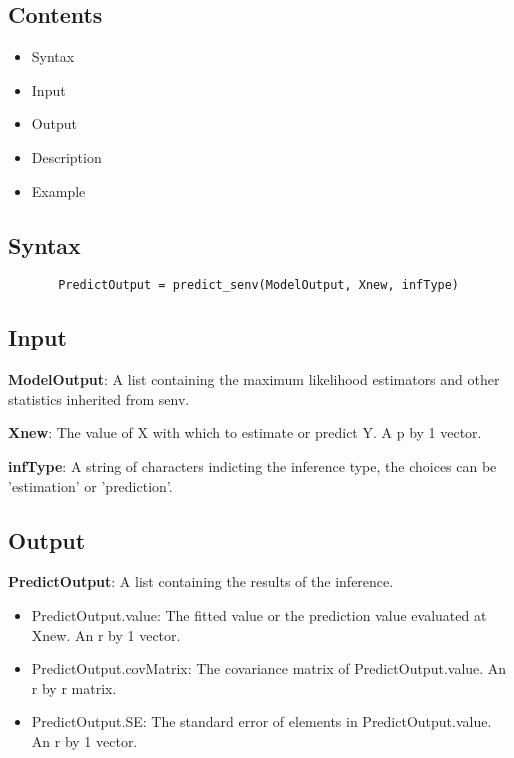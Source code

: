 \documentclass[a4paper,11pt,openany]{memoir}
\begin{document}
\subsection*{Contents}

\begin{itemize}
\setlength{\itemsep}{-1ex}
   \item Syntax
   \item Input
   \item Output
   \item Description
   \item Example
\end{itemize}


\subsection*{Syntax}


\begin{verbatim}       PredictOutput = predict_senv(ModelOutput, Xnew, infType)\end{verbatim}
    

\subsection*{Input}

\begin{par}
\textbf{ModelOutput}: A list containing the maximum likelihood estimators and other statistics inherited from senv.
\end{par} \vspace{1em}
\begin{par}
\textbf{Xnew}: The value of X with which to estimate or predict Y.  A p by 1 vector.
\end{par} \vspace{1em}
\begin{par}
\textbf{infType}: A string of characters indicting the inference type, the choices can be 'estimation' or 'prediction'.
\end{par} \vspace{1em}


\subsection*{Output}

\begin{par}
\textbf{PredictOutput}: A list containing the results of the inference.
\end{par} \vspace{1em}
\begin{itemize}
\setlength{\itemsep}{-1ex}
   \item PredictOutput.value: The fitted value or the prediction value evaluated at Xnew. An r by 1 vector.
   \item PredictOutput.covMatrix: The covariance matrix of PredictOutput.value. An r by r matrix.
   \item PredictOutput.SE: The standard error of elements in PredictOutput.value. An r by 1 vector.
\end{itemize}
\end{document}
